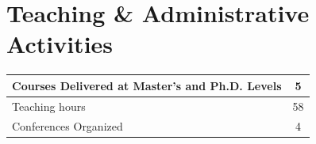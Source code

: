 \documentclass[a4paper]{article}
\newcommand{\block}[1]{\hrule \vspace{0.2cm} \textbf{\Large #1} \vspace{0.2cm}}
\newcommand{\voice}[5]{\href{#4}{\textbf{#1}} \hfill #2 \\ \textit{#3} \\ {\small #5} \vspace{0.2cm} \\}
\begin{document}
%




	\clearpage
	\section*{Teaching \& Administrative Activities}

		\begin{center}
	\begin{tabularx}{.5\linewidth}{|X|c|}
	\hline
	
	Courses Delivered at Master's and Ph.D. Levels & 5 \\
	\hline
	
	Teaching hours & 58 \\
	\hline

	Conferences Organized & 4 \\
	\hline	
	
	\end{tabularx}		
		\end{center}
	\vspace{1em}
\end{document}
